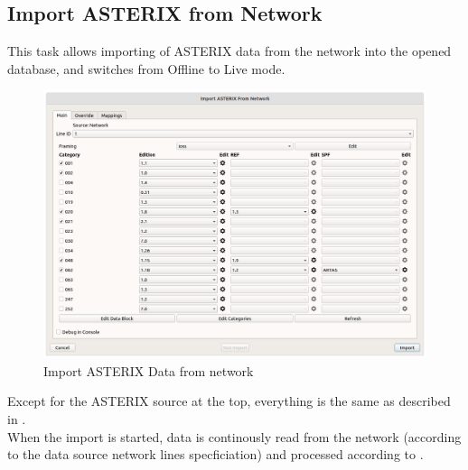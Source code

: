 \subsection{Import ASTERIX from Network}
\label{sec:ui_import_asterix_network}


This task allows importing of ASTERIX data from the network into the opened database, and switches from Offline to Live mode. \\

\begin{figure}[H]
  \center
    \hspace*{-0.5cm}
    \includegraphics[width=17cm]{figures/asterix_import_data_network.png}
  \caption{Import ASTERIX Data from network}
\end{figure}

Except for the ASTERIX source at the top, everything is the same as described in . \\

When the import is started, data is continously read from the network (according to the data source network lines specficiation) and processed according to .
